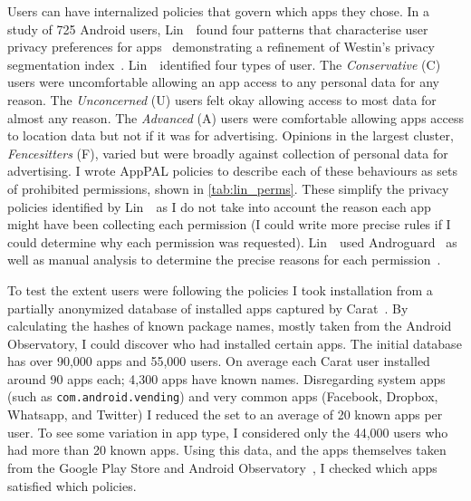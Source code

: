 \documentclass[thesis.tex]{subfiles}
\begin{document}
Users can have internalized policies that govern which apps they chose.
In a study of 725 Android users, Lin~\etal~found four patterns that characterise user privacy preferences for apps~\cite{lin_modeling_2014} demonstrating a refinement of Westin's privacy segmentation index~\cite{harris_interactive_privacy_2002}.
Lin~\etal~identified four types of user.
The \emph{Conservative} (C) users were uncomfortable allowing an app access to any personal data for any reason.
The \emph{Unconcerned} (U) users felt okay allowing access to most data for almost any reason.
The \emph{Advanced} (A) users were comfortable allowing apps access to location data but not if it was for advertising.
Opinions in the largest cluster, \emph{Fencesitters} (F), varied but were broadly against collection of personal data for advertising.
I wrote AppPAL policies to describe each of these behaviours as sets of prohibited permissions, shown in \autoref{tab:lin_perms}.
These simplify the privacy policies identified by Lin~\etal~as I do not take into account the reason each app might have been collecting each permission
(I could write more precise rules if I could determine why each permission was requested).
Lin~\etal~used Androguard~\cite{andrew_desnos_androguard_2012} as well as manual analysis to determine the precise reasons for each permission~\cite{lin_modeling_2014}.

To test the extent users were following the policies I took installation from a partially anonymized database of installed apps captured by Carat~\cite{oliner_carat:_2013}.
By calculating the hashes of known package names, mostly taken from the Android Observatory, I could discover who had installed certain apps.
The initial database has over 90,000 apps and 55,000 users.
On average each Carat user installed around 90 apps each; 4,300 apps have known names.
Disregarding system apps (such as \texttt{com.android.vending}) and very common apps (Facebook, Dropbox, Whatsapp, and Twitter) I reduced the set to an average of 20 known apps per user.
To see some variation in app type, I considered only the 44,000 users who had more than 20 known apps.
Using this data, and the apps themselves taken from the Google Play Store and Android Observatory~\cite{barrera_understanding_2012}, I checked which apps satisfied which policies.
\end{document}
